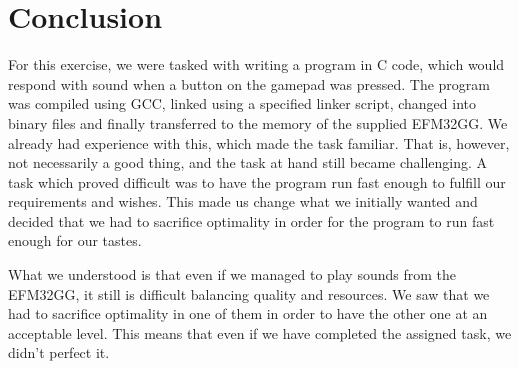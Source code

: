 \chapter{Conclusion}

For this exercise, we were tasked with writing a program in C code, which would
respond with sound when a button on the gamepad was pressed. The program was
compiled using GCC, linked using a specified linker script, changed into binary
files and finally transferred to the memory of the supplied EFM32GG. We already
had experience with this, which made the task familiar. That is, however, not
necessarily a good thing, and the task at hand still became challenging. A task
which proved difficult was to have the program run fast enough to fulfill our
requirements and wishes. This made us change what we initially wanted and
decided that we had to sacrifice optimality in order for the program to run fast
enough for our tastes.

What we understood is that even if we managed to play sounds from the EFM32GG,
it still is difficult balancing quality and resources. We saw that we
had to sacrifice optimality in one of them in order to have the other one at an
acceptable level. This means that even if we have completed the assigned task,
we didn't perfect it.
